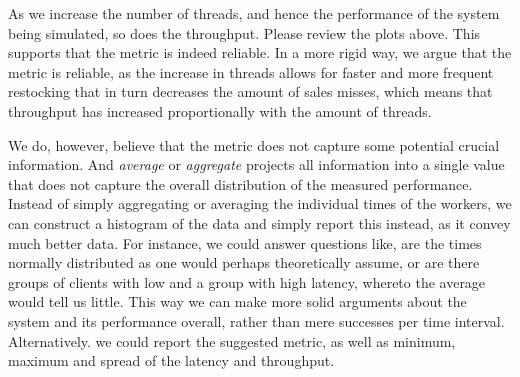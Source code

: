 As we increase the number of threads, and hence the performance of the system
being simulated, so does the throughput. Please review the plots above. This
supports that the metric is indeed reliable. In a more rigid way, we argue that
the metric is reliable, as the increase in threads allows for faster and more
frequent restocking that in turn decreases the amount of sales misses, which
means that throughput has increased proportionally with the amount of threads.

We do, however, believe that the metric does not capture some potential
crucial information. And {\it average} or {\it aggregate} projects all
information into a single value that does not capture the overall distribution
of the measured performance. Instead of simply aggregating or averaging the
individual times of the workers, we can construct a histogram of the data and
simply report this instead, as it convey much better data. For instance, we
could answer questions like, are the times normally distributed as one would
perhaps theoretically assume, or are there groups of clients with low and a
group with high latency, whereto the average would tell us little. This way we
can make more solid arguments about the system and its performance overall,
rather than mere successes per time interval. Alternatively. we could report
the suggested metric, as well as minimum, maximum and spread of the latency
and throughput.
